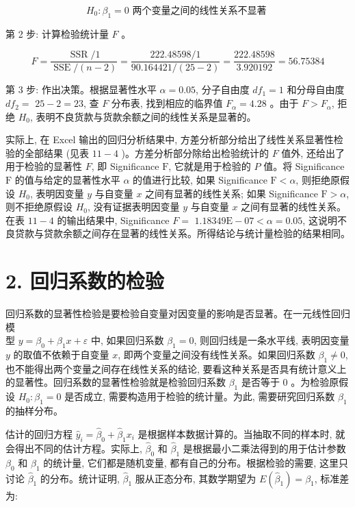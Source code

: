 \documentclass[10pt]{article}
\begin{document}
\begin{CJK*}{UTF8}{bsmi}
$$
H_{0}: \beta_{1}=0 \text { 两个变量之间的线性关系不显著 }
$$

第 2 步: 计算检验统计量 $F$ 。

$$
F=\frac{\operatorname{SSR} / 1}{\operatorname{SSE} /(n-2)}=\frac{222.48598 / 1}{90.164421 /(25-2)}=\frac{222.48598}{3.920192}=56.75384
$$

第 3 步: 作出决策。根据显著性水平 $\alpha=0.05$, 分子自由度 $d f_{1}=1$ 和分母自由度 $d f_{2}=$ $25-2=23$, 查 $F$ 分布表, 找到相应的临界值 $F_{\alpha}=4.28$ 。由于 $F>F_{\alpha}$, 拒绝 $H_{0}$, 表明不良货款与货款余额之间的线性关系是显著的。

实际上, 在 Excel 输出的回归分析结果中, 方差分析部分给出了线性关系显著性检验的全部结果 (见表 $11-4$ )。方差分析部分除给出检验统计的 $F$ 值外, 还给出了用于检验的显著性 $F$, 即 Significance $\mathrm{F}$, 它就是用于检验的 $P$ 值。将 Significance $\mathrm{F}$ 的值与给定的显著性水平 $\alpha$ 的值进行比较, 如果 Significance $\mathrm{F}<\alpha$, 则拒绝原假设 $H_{0}$, 表明因变量 $y$ 与自变量 $x$ 之间有显著的线性关系; 如果 Significance $\mathrm{F}>\alpha$, 则不拒绝原假设 $H_{0}$, 没有证据表明因变量 $y$ 与自变量 $x$ 之间有显著的线性关系。在表 $11-4$ 的输出结果中, Significance $F=$ $1.18349 \mathrm{E}-07<\alpha=0.05$, 这说明不良贷款与贷款余额之间存在显著的线性关系。所得结论与统计量检验的结果相同。

\section*{2. 回归系数的检验}
回归系数的显著性检验是要检验自变量对因变量的影响是否显著。在一元线性回归模\\
型 $y=\beta_{0}+\beta_{1} x+\varepsilon$ 中, 如果回归系数 $\beta_{1}=0$, 则回归线是一条水平线, 表明因变量 $y$ 的取值不依赖于自变量 $x$, 即两个变量之间没有线性关系。如果回归系数 $\beta_{1} \neq 0$, 也不能得出两个变量之间存在线性关系的结论, 要看这种关系是否具有统计意义上的显著性。回归系数的显著性检验就是检验回归系数 $\beta_{1}$ 是否等于 0 。为检验原假设 $H_{0}: \beta_{1}=0$ 是否成立, 需要构造用于检验的统计量。为此, 需要研究回归系数 $\beta_{1}$ 的抽样分布。

估计的回归方程 $\hat{y}_{i}=\hat{\beta}_{0}+\hat{\beta}_{1} x_{i}$ 是根据样本数据计算的。当抽取不同的样本时, 就会得出不同的估计方程。实际上, $\hat{\beta}_{0}$ 和 $\hat{\beta}_{1}$ 是根据最小二乘法得到的用于估计参数 $\beta_{0}$ 和 $\beta_{1}$ 的统计量, 它们都是随机变量, 都有自己的分布。根据检验的需要, 这里只讨论 $\hat{\beta}_{1}$ 的分布。统计证明, $\hat{\beta}_{1}$ 服从正态分布, 其数学期望为 $E\left(\hat{\beta}_{1}\right)=\beta_{1}$, 标准差为:



\end{CJK*}
\end{document}

